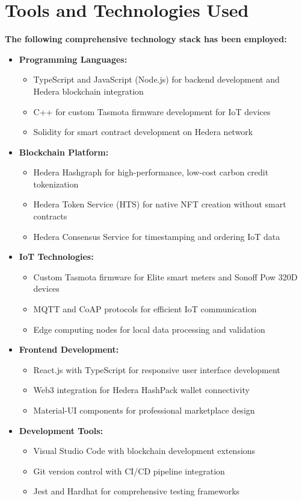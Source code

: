 \documentclass[oneside,a4paper,12pt]{book}
\begin{document}
  \section{Tools and Technologies Used}
  \begin{flushleft}
    \textbf{The following comprehensive technology stack has been employed:}
    \begin{itemize}
      \item \textbf{Programming Languages:}
        \begin{itemize}
          \item TypeScript and JavaScript (Node.js) for backend development and Hedera blockchain integration
          \item C++ for custom Tasmota firmware development for IoT devices
          \item Solidity for smart contract development on Hedera network
        \end{itemize}
      \item \textbf{Blockchain Platform:}
        \begin{itemize}
          \item Hedera Hashgraph for high-performance, low-cost carbon credit tokenization
          \item Hedera Token Service (HTS) for native NFT creation without smart contracts
          \item Hedera Consensus Service for timestamping and ordering IoT data
        \end{itemize}
      \item \textbf{IoT Technologies:}
        \begin{itemize}
          \item Custom Tasmota firmware for Elite smart meters and Sonoff Pow 320D devices
          \item MQTT and CoAP protocols for efficient IoT communication
          \item Edge computing nodes for local data processing and validation
        \end{itemize}
      \item \textbf{Frontend Development:}
        \begin{itemize}
          \item React.js with TypeScript for responsive user interface development
          \item Web3 integration for Hedera HashPack wallet connectivity
          \item Material-UI components for professional marketplace design
        \end{itemize}
      \item \textbf{Development Tools:}
        \begin{itemize}
          \item Visual Studio Code with blockchain development extensions
          \item Git version control with CI/CD pipeline integration
          \item Jest and Hardhat for comprehensive testing frameworks
        \end{itemize}
    \end{itemize}
  \end{flushleft}
  
\end{document}
